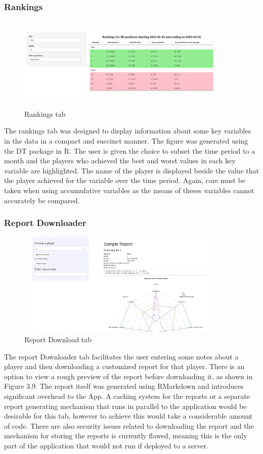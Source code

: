 \subsubsection{Rankings}
\begin{figure}
	\vspace{-2em}
	\includegraphics[height=4.5cm, width=10cm]{Images/RankingsTab.png}
	\caption{Rankings tab}
\end{figure}
The rankings tab was designed to display information about some key variables in the data in a compact and succinct manner. The figure was generated using the DT package in R. The user is given the choice to subset the time period to a month and the players who achieved the best and worst values in each key variable are highlighted. The name of the player is displayed beside the value that the player achieved for the variable over the time period. Again, care must be taken when using accumulative variables as the means of theses variables cannot accurately be compared.


\subsubsection{Report Downloader}
\begin{figure}
	\vspace{-2em}
	\includegraphics[height=5cm, width=10cm]{Images/DownloadReportTab.png}
	\caption{Report Download tab}
\end{figure}
The report Downloader tab facilitates the user entering some notes about a player and then downloading a customized report for that player. There is an option to view a rough preview of the report before downloading it, as shown in Figure 3.9. The report itself was generated using RMarkdown and introduces significant overhead to the App. A caching system for the reports or a separate report generating mechanism that runs in parallel to the application would be desirable for this tab, however to achieve this would take a considerable amount of code. There are also security issues related to downloading the report and the mechanism for storing the reports is currently flawed, meaning this is the only part of the application that would not run if deployed to a server.

